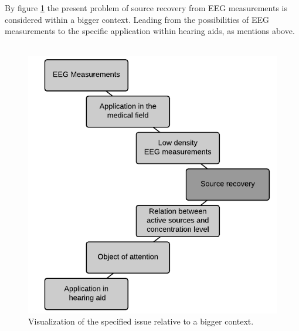 By figure \ref{fig:problem} the present problem of source recovery from EEG measurements is considered within a bigger context. Leading from the possibilities of EEG measurements to the specific application within hearing aids, as mentions above.    
\\ \\
\begin{figure}[H]
\centering
\includegraphics[scale=0.85]{figures/ch_intro/system.png}
\caption{Visualization of the specified issue relative to a bigger context.}
\label{fig:problem}
\end{figure}





